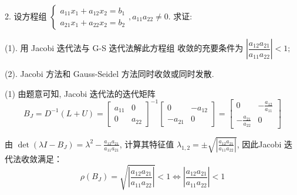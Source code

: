 \begin{tcolorbox}[breakable,enhanced,arc=0mm,outer arc=0mm,
		boxrule=0pt,toprule=1pt,leftrule=0pt,bottomrule=1pt, rightrule=0pt,left=0.2cm,right=0.2cm,
		titlerule=0.5em,toptitle=0.1cm,bottomtitle=-0.1cm,top=0.2cm,
		colframe=white!10!biru,colback=white!90!biru,coltitle=white,
            coltext=black,title =2024-04, title style={white!10!biru}, before skip=8pt, after skip=8pt,before upper=\hspace{2em},
		fonttitle=\bfseries,fontupper=\normalsize]
  
2. 设方程组 $ \left\{\begin{array}{l}a_{11} x_{1}+a_{12} x_{2}=b_{1} \\ a_{21} x_{1}+a_{22} x_{2}=b_{2}\end{array}, a_{11} a_{22} \neq 0\right. $.
求证: 

(1). 用 Jacobi 迭代法与 G-S 迭代法解此方程组
收敛的充要条件为 $\left|\dfrac{a_{12} a_{21}}{a_{11} a_{22}}\right|<1 ;$

(2). Jacobi 方法和 Gauss-Seidel 方法同时收敛或同时发散.
\tcblower

 (1) 由题意可知, Jacobi 迭代法的迭代矩阵
$$
B_{J}=D^{-1}(L+U)=\left[\begin{array}{cc}
a_{11} & 0 \\
0 & a_{22}
\end{array}\right]^{-1}\left[\begin{array}{cc}
0 & -a_{12} \\
-a_{21} & 0
\end{array}\right]=\left[\begin{array}{cc}
0 & -\frac{a_{12}}{a_{11}} \\
-\frac{a_{21}}{a_{22}} & 0
\end{array}\right]
$$

由 $ \operatorname{det}\left(\lambda I-B_{J}\right)=\lambda^{2}-\frac{a_{12} a_{21}}{a_{11} a_{21}} $, 计算其特征值 $ \lambda_{1,2}= \pm \sqrt{\left|\frac{a_{12} a_{21}}{a_{11} a_{22}}\right|} $, 因此Jacobi 迭代法收敛满足：
$$
\rho\left(B_{J}\right)=\sqrt{\left|\frac{a_{12} a_{21}}{a_{11} a_{22}}\right|}<1\iff \left|\dfrac{a_{12} a_{21}}{a_{11} a_{22}}\right|<1
$$


\end{tcolorbox}
